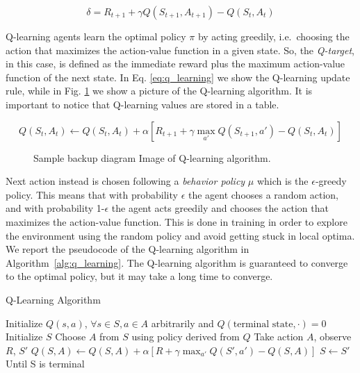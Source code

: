\begin{equation} \label{eq:td_error}
    \delta = R_{t+1} + \gamma Q(S_{t+1}, A_{t+1}) - Q(S_t, A_t)
\end{equation}



Q-learning agents learn the optimal policy $\pi$ by acting greedily, i.e.\ choosing the action that maximizes the action-value function in a given state.
So, the \textit{Q-target}, in this case, is defined as the immediate reward plus the maximum action-value function of the next state.
In Eq. \ref{eq:q_learning} we show the Q-learning update rule, while in Fig. \ref{fig:q_learning} we show a picture of the Q-learning algorithm.
It is important to notice that Q-learning values are stored in a table.

\begin{equation} \label{eq:q_learning}
    Q(S_t, A_t) \leftarrow Q(S_t, A_t) + \alpha [R_{t+1} + \gamma \max_{a'} Q(S_{t+1}, a') - Q(S_t, A_t)]
\end{equation}

\begin{figure}[ht]
    \begin{center}
        \fbox{\rule[-.5cm]{0cm}{4cm} \rule[-.5cm]{4cm}{0cm}}
    \end{center}
    \caption{Sample backup diagram Image of Q-learning algorithm.}
    \label{fig:q_learning}
\end{figure}


Next action instead is chosen following a \textit{behavior policy} $\mu$ which is the $\epsilon$-greedy policy.
This means that with probability $\epsilon$ the agent chooses a random action, and with probability 1-$\epsilon$ the agent acts greedily and chooses the action that maximizes the action-value function.
This is done in training in order to explore the environment using the random policy and avoid getting stuck in local optima.
We report the pseudocode of the Q-learning algorithm in Algorithm~\ref{alg:q_learning}.
The Q-learning algorithm is guaranteed to converge to the optimal policy, but it may take a long time to converge.



\begin{algorithm}
\caption{Q-Learning Algorithm}\label{alg:q_learning}
\begin{algorithmic}
\State Initialize $Q(s, a)$,  $\forall s \in S, a \in A$ arbitrarily and $Q(\text{terminal state}, \cdot) = 0$
    \State Initialize $S$
        \State Choose $A$ from $S$ using policy derived from $Q$
        \State Take action $A$, observe $R$, $S'$
        \State $Q(S, A) \leftarrow Q(S, A) + \alpha [R + \gamma \max_{a'} Q(S', a') - Q(S, A)]$
        \State $S \leftarrow S'$
    \EndFor
\State Until S is terminal
\EndFor




\end{algorithmic}
\end{algorithm}






